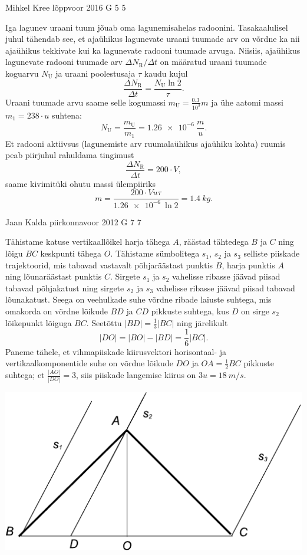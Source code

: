 \documentclass[11pt]{article}
\begin{document}
{%
{Mihkel Kree} %
{lõppvoor} %
{2016} %
{G 5} %
{5} %
{

\ifSolution
Iga lagunev uraani tuum jõuab oma lagunemisahelas radoonini. Tasakaalulisel juhul tähendab see, et ajaühikus lagunevate uraani tuumade arv on võrdne ka nii ajaühikus tekkivate kui ka lagunevate radooni tuumade arvuga. Niisiis, ajaühikus lagunevate radooni tuumade arv $\Delta N_\text{R} / \Delta t$ on määratud uraani tuumade koguarvu $N_\text{U}$ ja uraani poolestusaja $\tau$ kaudu kujul
\[
\frac{\Delta N_\text{R}}{\Delta t} = \frac{N_\text{U} \ln 2}{\tau}.
\]
Uraani tuumade arvu saame selle kogumassi $m_\text{U} = \frac{\SI{0.3}{}}{10^3} m$ ja ühe aatomi massi $m_1=238 \cdot u$ suhtena:
\[
N_\text{U}=\frac{m_\text{U}}{m_1}=\SI{1.26e-6}{} \frac{m}{u}.
\]
Et radooni aktiivsus (lagunemiste arv ruumalaühikus ajaühiku kohta) ruumis peab piirjuhul rahuldama tingimust
\[
\frac{\Delta N_\text{R}}{\Delta t} = 200\cdot V,
\]
saame kivimitüki ohutu massi ülempiiriks
\[
m = \frac{200\cdot V u \tau}{\SI{1.26e-6}{}\ln 2}=\SI{1.4}{kg}.
\]
\fi
}

{Jaan Kalda} %
{piirkonnavoor} %
{2012} %
{G 7} %
{7} %
{

\ifSolution
Tähistame katuse vertikaallõikel harja tähega $A$, räästad tähtedega $B$ ja $C$ ning lõigu $BC$ keskpunti tähega $O$. 
Tähistame sümbolitega $s_1$, $s_2$ ja $s_3$ selliste piiskade trajektoorid, mis tabavad vastavalt põhjaräästast punktis $B$, harja punktis $A$ ning lõunaräästast punktis $C$. Sirgete $s_1$ ja $s_2$ vahelisse ribasse jäävad piisad tabavad põhjakatust ning sirgete $s_2$ ja $s_3$ vahelisse ribasse jäävad 
piisad tabavad lõunakatust. Seega on veehulkade suhe võrdne ribade laiuste suhtega, mis omakorda on võrdne lõikude $BD$ ja $CD$ pikkuste suhtega, kus $D$ on sirge $s_2$ lõikepunkt lõiguga $BC$. Seetõttu $|BD|=\frac 13 |BC|$ ning järelikult
\[
|DO|=|BO|-|BD|=\frac 16 |BC|.
\]
Paneme tähele, et vihmapiiskade 
kiirusvektori horisontaal- ja vertikaalkomponentide suhe on võrdne lõikude $DO$ ja $OA=\frac 12 BC$ pikkuste suhtega; et $\frac {|AO|}{|DO|}=3$, siis piiskade 
langemise kiirus on $3u=\SI{18}{m/s}$.

\begin{center}
\includegraphics[width=0.5\linewidth]{2012-v2g-07-katus}
\end{center}
\fi
}

}
\end{document}
